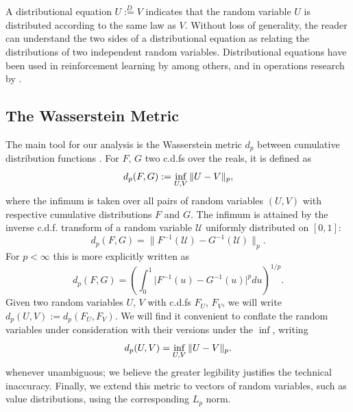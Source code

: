 \documentclass{article}
\def \Ddef {\overset{D}{:=}}
\begin{document}
A distributional equation $U \Ddef V$ indicates that the random variable $U$ is distributed according to the same law as $V$. Without loss of generality, the reader can understand the two sides of a distributional equation as relating the distributions of two independent random variables.
Distributional equations have been used in reinforcement learning by \citet{engel05reinforcement,morimura10parametric} among others, and in operations research by \citet{white88mean}.

\subsection{The Wasserstein Metric}

The main tool for our analysis is the Wasserstein metric $d_p$ between cumulative distribution functions \citep[see e.g.][where it is called the Mallows metric]{bickel81asymptotic}. For $F$, $G$ two c.d.fs over the reals, it is defined as
\begin{equation*}
d_p(F, G) := \inf_{U, V} \| U - V \|_p,
\end{equation*}
where the infimum is taken over all pairs of random variables $(U, V)$ with respective cumulative distributions $F$ and $G$. The infimum is attained by the inverse c.d.f. transform of a random variable $\mathcal{U}$ uniformly distributed on $[0, 1]$:
\begin{equation*}
d_p(F, G) = \| F^{-1}(\mathcal{U}) - G^{-1}(\mathcal{U}) \|_p .
\end{equation*}
For $p < \infty$ this is more explicitly written as
\begin{equation*}
d_p(F, G) = \left ( \int_0^1 \big | F^{-1}(u) - G^{-1}(u) \big |^p du \right )^{1/p} .
\end{equation*}
Given two random variables $U$, $V$ with c.d.fs $F_U$, $F_V$, we will write $d_p(U, V) := d_p(F_U, F_V)$. We will find it convenient to conflate the random variables under consideration with their versions under the $\inf$, writing
\begin{equation*}
d_p(U, V) = \inf_{U,V} \| U - V \|_p .
\end{equation*}
whenever unambiguous; we believe the greater legibility justifies the technical inaccuracy.
Finally, we extend this metric to vectors of random variables, such as value distributions, using the corresponding $L_p$ norm.
\end{document}
